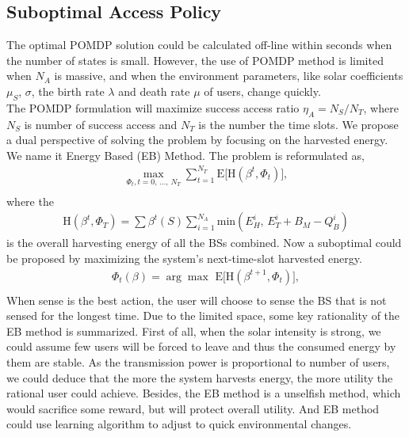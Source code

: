 \documentclass[conference]{IEEEtran}
\begin{document}
\subsection{Suboptimal Access Policy}
The optimal POMDP solution could be calculated off-line within seconds when the number of states is small.
However, the use of POMDP method is limited when \(N_A\) is massive,
and when the environment parameters, like solar coefficients \(\mu_S\), \(\sigma\),
the birth rate \(\lambda\) and death rate \(\mu\) of users, change quickly.\\
The POMDP formulation will maximize success access ratio \(\eta_A = N_S/N_T\),
where \(N_S\) is number of success access and \(N_T\) is the number the time slots.
We propose a dual perspective of solving the problem by focusing on the harvested energy.
We name it Energy Based (EB) Method.
The problem is reformulated as,
\begin{equation}
\begin{aligned}
	\underset{\Phi_t,t=0,\,\ldots,\,N_T}{\max}\sum\nolimits_{t=1}^{N_T}
	\mbox{E}\lbrack\mbox{H}\left(\beta^t, \Phi_t\right)\rbrack,\\
\end{aligned}
\end{equation}
where the
\begin{equation}
\begin{aligned}
	\mbox{H}\left(\beta^t, \Phi_T\right) = \sum\beta^t\left(S\right)\sum_{i=1}^{N_A}\mbox{min}\left(E_H^i,\,E_T^i+B_M-Q_B^i\right)
\end{aligned}
\end{equation}
is the overall harvesting energy of all the BSs combined.
Now a suboptimal could be proposed by maximizing the system's next-time-slot harvested energy.
\begin{equation}
\begin{aligned}
	\Phi_t\left(\beta\right) = \arg{\max}\,\,\mbox{E}\lbrack\mbox{H}(\beta^{t+1}, \Phi_t)\rbrack,\\
\end{aligned}
\end{equation}
When sense is the best action, the user will choose to sense the BS that is not sensed for the longest time.
Due to the limited space, some key rationality of the EB method is summarized.
First of all, when the solar intensity is strong,
we could assume few users will be forced to leave and thus the consumed energy by them are stable.
As the transmission power is proportional to number of users,
we could deduce that the more the system harvests energy, 
the more utility the rational user could achieve.
Besides, the EB method is a unselfish method, which would sacrifice some reward,
but will protect overall utility. 
And EB method could use learning algorithm to adjust to quick environmental changes.
\end{document}
